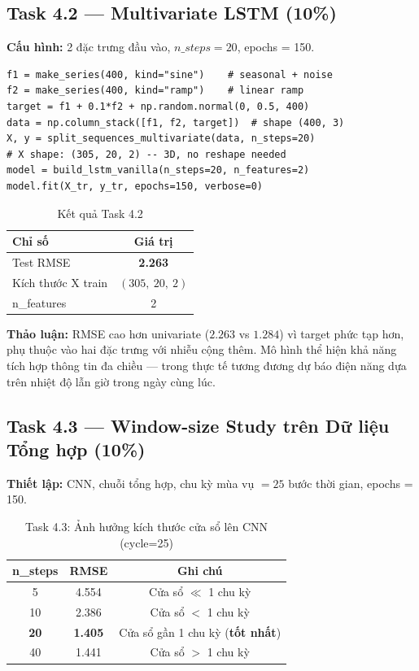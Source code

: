\documentclass[12pt,a4paper]{article}
\begin{document}
\subsection{Task 4.2 --- Multivariate LSTM (10\%)}

\textbf{Cấu hình:} 2 đặc trưng đầu vào, $n\_steps = 20$, epochs = 150.

\begin{lstlisting}[caption=Triển khai Exercise 2]
f1 = make_series(400, kind="sine")    # seasonal + noise
f2 = make_series(400, kind="ramp")    # linear ramp
target = f1 + 0.1*f2 + np.random.normal(0, 0.5, 400)
data = np.column_stack([f1, f2, target])  # shape (400, 3)
X, y = split_sequences_multivariate(data, n_steps=20)
# X shape: (305, 20, 2) -- 3D, no reshape needed
model = build_lstm_vanilla(n_steps=20, n_features=2)
model.fit(X_tr, y_tr, epochs=150, verbose=0)
\end{lstlisting}

\begin{table}[H]
\centering
\caption{Kết quả Task 4.2}
\begin{tabular}{lc}
\toprule
\textbf{Chỉ số} & \textbf{Giá trị} \\
\midrule
Test RMSE & \textbf{2.263} \\
Kích thước X train & $(305,\ 20,\ 2)$ \\
n\_features & 2 \\
\bottomrule
\end{tabular}
\end{table}

\textbf{Thảo luận:} RMSE cao hơn univariate ($2.263$ vs $1.284$) vì target phức tạp hơn, phụ thuộc vào hai đặc trưng với nhiễu cộng thêm. Mô hình thể hiện khả năng tích hợp thông tin đa chiều --- trong thực tế tương đương dự báo điện năng dựa trên nhiệt độ lẫn giờ trong ngày cùng lúc.

\subsection{Task 4.3 --- Window-size Study trên Dữ liệu Tổng hợp (10\%)}

\textbf{Thiết lập:} CNN, chuỗi tổng hợp, chu kỳ mùa vụ $= 25$ bước thời gian, epochs = 150.

\begin{table}[H]
\centering
\caption{Task 4.3: Ảnh hưởng kích thước cửa sổ lên CNN (cycle=25)}
\begin{tabular}{ccc}
\toprule
\textbf{n\_steps} & \textbf{RMSE} & \textbf{Ghi chú} \\
\midrule
5  & 4.554 & Cửa sổ $\ll$ 1 chu kỳ \\
10 & 2.386 & Cửa sổ $< $ 1 chu kỳ \\
\textbf{20} & \textbf{1.405} & Cửa sổ gần 1 chu kỳ (\textbf{tốt nhất}) \\
40 & 1.441 & Cửa sổ $> $ 1 chu kỳ \\
\bottomrule
\end{tabular}
\end{table}
\end{document}
